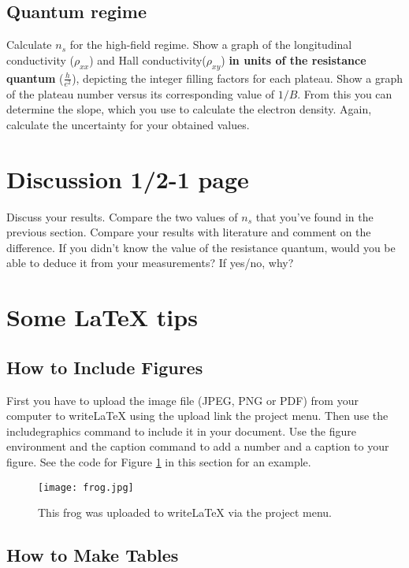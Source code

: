 \documentclass[a4paper]{article}
\begin{document}
\subsection{Quantum regime}
Calculate $n_{s}$ for the high-field regime.
Show a graph of the longitudinal conductivity ($\rho_{xx}$) and Hall conductivity($\rho_{xy}$) \textbf{in units of the resistance quantum} ($\frac{h}{e^{2}}$), depicting the integer filling factors for each plateau.
Show a graph of the plateau number versus its corresponding value of $1/B$. From this you can determine the slope, which you use to calculate the electron density.
Again, calculate the uncertainty for your obtained values.

\section{Discussion 1/2-1 page}
Discuss your results. Compare the two values of $n_{s}$ that you've found in the previous section. Compare your results with literature and comment on the difference. If you didn't know the value of the resistance quantum, would you be able to deduce it from your measurements? If yes/no, why?

\newpage
\section{Some LaTeX tips}
\label{sec:latex}
\subsection{How to Include Figures}

First you have to upload the image file (JPEG, PNG or PDF) from your computer to writeLaTeX using the upload link the project menu. Then use the includegraphics command to include it in your document. Use the figure environment and the caption command to add a number and a caption to your figure. See the code for Figure \ref{fig:frog} in this section for an example.

\begin{figure}
\centering
\texttt{[image: frog.jpg]}
\caption{\label{fig:frog}This frog was uploaded to writeLaTeX via the project menu.}
\end{figure}

\subsection{How to Make Tables}
\end{document}
